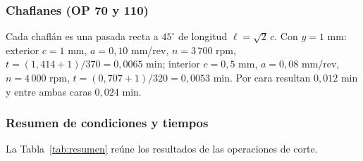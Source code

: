 \documentclass[12pt,a4paper]{article}
\begin{document}
\subsubsection{Chaflanes (OP 70 y 110)}

Cada chaflán es una pasada recta a $45^\circ$ de longitud $\ell=\sqrt2\,c$. Con
$y=1$ mm: exterior $c=1$ mm, $a=0{,}10$ mm/rev, $n=3\,700$ rpm,
$t=(1{,}414+1)/370=0{,}0065$ min; interior $c=0{,}5$ mm, $a=0{,}08$ mm/rev,
$n=4\,000$ rpm, $t=(0{,}707+1)/320=0{,}0053$ min. Por cara resultan $0{,}012$
min
y entre ambas caras $0{,}024$ min.

\subsubsection{Resumen de condiciones y tiempos}

La Tabla~\ref{tab:resumen} reúne los resultados de las operaciones de corte.
\end{document}
